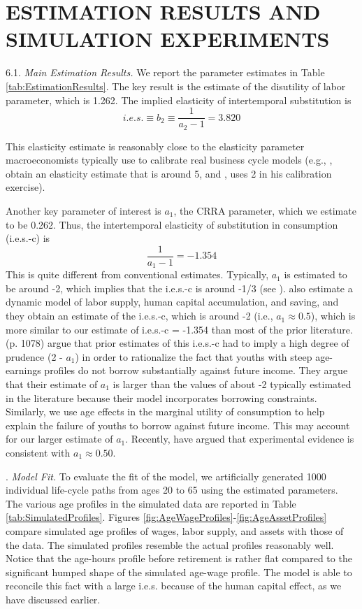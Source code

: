 \documentclass{article}
\begin{document}
\section{ESTIMATION RESULTS AND SIMULATION EXPERIMENTS}
\label{section:estimation}
6.1.     \textit{Main Estimation Results.}    We report the parameter estimates in Table \ref{tab:EstimationResults}. The key result is the estimate of the disutility of labor parameter, which is 1.262. The implied elasticity of intertemporal substitution is
$$ i.e.s. \equiv b_2 \equiv \dfrac{1}{a_2-1} = 3.820 $$

This elasticity estimate is reasonably close to the elasticity parameter macroeconomists typically use to calibrate real business cycle models (e.g., \cite{Eichenbaum1988-kg}, obtain an elasticity estimate that is around 5, and \cite{Prescott1986-vn}, uses 2 in his calibration exercise). \par
Another key parameter of interest is $a_1$, the CRRA parameter, which we estimate to be 0.262. Thus, the intertemporal elasticity of substitution in consumption (i.e.s.-c) is
$$ \dfrac{1}{a_1-1} = -1.354$$
This is quite different from conventional estimates. Typically, $a_1$ is estimated to be around -2, which implies that the i.e.s.-c is around -1/3 (see \cite{Hubbard1994-qp}). \cite{Keane2001-yk} also estimate a dynamic model of labor supply, human capital accumulation, and saving, and they obtain an estimate of the i.e.s.-c, which is around -2 (i.e., $a_1 \approx 0.5$), which is more similar to our estimate of i.e.s.-c = -1.354 than most of the prior literature. \cite{Keane2001-yk} (p. 1078) argue that prior estimates of this i.e.s.-c had to imply a high degree of prudence (2 - $a_1$) in order to rationalize the fact that youths with steep age-earnings profiles do not borrow substantially against future income. They argue that their estimate of $a_1$ is larger than the values of about -2 typically estimated in the literature because their model incorporates borrowing constraints. Similarly, we use age effects in the marginal utility of consumption to help explain the failure of youths to borrow against future income. This may account for our larger estimate of $a_1$. Recently, \cite{Goeree2000-la} have argued that experimental evidence is consistent with $a_1 \approx 0.50$. \par

.     \textit{Model Fit.}     To evaluate the fit of the model, we artificially generated 1000 individual life-cycle paths from ages 20 to 65 using the estimated parameters. The various age profiles in the simulated data are reported in Table \ref{tab:SimulatedProfiles}. Figures \ref{fig:AgeWageProfiles}-\ref{fig:AgeAssetProfiles} compare simulated age profiles of wages, labor supply, and assets with those of the data. The simulated profiles resemble the actual profiles reasonably well. Notice that the age-hours profile before retirement is rather flat compared to the significant humped shape of the simulated age-wage profile. The model is able to reconcile this fact with a large i.e.s. because of the human capital effect, as we have discussed earlier. \par
\end{document}
